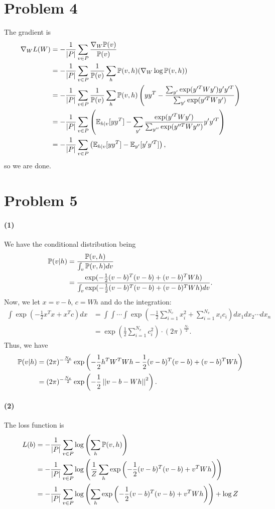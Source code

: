 \documentclass[a4 paper,12pt]{article}
\begin{document}
\section*{Problem 4}
The gradient is
\begin{align*}
\nabla_W L(W)&=-\frac{1}{|P|}\sum_{v\in P}\frac{\nabla_W\mathbb{P}(v)}{\mathbb{P}(v)}\\
&=-\frac{1}{|P|}\sum_{v\in P}\frac{1}{\mathbb{P}(v)}\sum_h \mathbb{P}(v,h)(\nabla_W \log \mathbb{P}(v,h))\\
&=-\frac{1}{|P|}\sum_{v\in P}\frac{1}{\mathbb{P}(v)}\sum_h \mathbb{P}(v,h)\left(yy^T-\frac{\sum_{y'}\exp(y'^TWy')y'y'^T}{\sum_{y'}\exp(y'^TWy')}\right)\\
&=-\frac{1}{|P|}\sum_{v\in P}\left(\mathbb{E}_{h|v}[yy^T]-\sum_{y'}\frac{\exp(y'^TWy')}{\sum_{y''}\exp(y''^TWy'')}y'y'^T\right)\\
&=-\frac{1}{|P|}\sum_{v\in P}\left(\mathbb{E}_{h|v}[yy^T]-\mathbb{E}_{y'}[y'y'^T]\right),
\end{align*} so we are done.
\newcommand*{\mo}[1]{\left|\left|#1\right|\right|}
\section*{Problem 5}
\paragraph*{(1)}
We have the conditional distribution being
\begin{align*}
\mathbb{P}(v|h)&=\frac{\mathbb{P}(v,h)}{\int_v \mathbb{P}(v,h)dv}\\
&=\frac{\exp(-\frac{1}{2}(v-b)^T(v-b)+(v-b)^TWh)}{\int_v \exp(-\frac{1}{2}(v-b)^T(v-b)+(v-b)^TWh)dv}.
\end{align*}
Now, we let $x=v-b$, $c=Wh$ and do the integration:
\begin{align*}
\int\exp\left(-\frac{1}{2}x^Tx+x^Tc\right)dx&=\int\int\cdots\int \exp\left(-\frac{1}{2}\sum_{i=1}^{N_v} x_i^2+\sum_{i=1}^{N_v} x_ic_i\right)dx_1dx_2\cdots dx_n\\
&=\exp\left(\frac{1}{2}\sum_{i=1}^{{N_v}}c_i^2\right)\cdot (2\pi)^{\frac{{N_v}}{2}}.
\end{align*} Thus, we have
\begin{align*}
\p(v|h)&=(2\pi)^{-\frac{N_v}{2}}\exp\left(-\frac{1}{2}h^TW^TWh-\frac{1}{2}(v-b)^T(v-b)+(v-b)^TWh\right)\\
&=(2\pi)^{-\frac{N_v}{2}}\exp\left(-\frac{1}{2}\mo{v-b-Wh}^2\right).
\end{align*}
\paragraph*{(2)}
The loss function is
\begin{align*}
L(b)&=-\frac{1}{|P|}\sum_{v\in P}\log \left(\sum_h \mathbb{P}(v,h)\right)\\
&=-\frac{1}{|P|}\sum_{v\in P}\log\left(\frac{1}{Z}\sum_{h}\exp\left(-\frac{1}{2}(v-b)^T(v-b)+v^TWh\right)\right)\\
&=-\frac{1}{|P|}\sum_{v\in P}\log\left(\sum_{h}\exp\left(-\frac{1}{2}(v-b)^T(v-b)+v^TWh\right)\right)+\log Z
\end{align*} 
\end{document}
